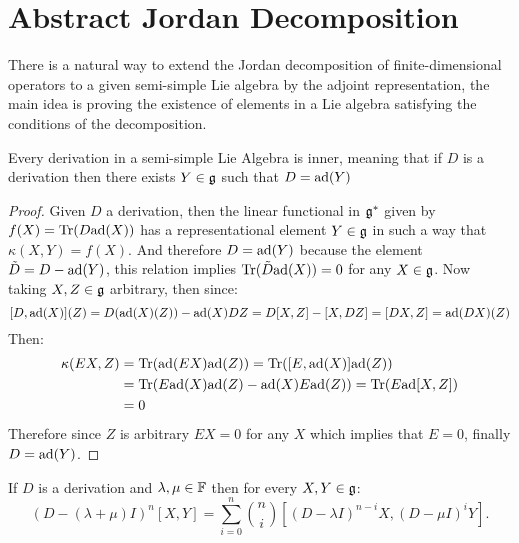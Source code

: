 \section{Abstract Jordan Decomposition}
There is a natural way to extend the Jordan decomposition of finite-dimensional operators to a given semi-simple Lie algebra by the adjoint representation, the main idea is proving the existence of elements in a Lie algebra satisfying the conditions of the decomposition.\\
\begin{lema}
Every derivation in a semi-simple Lie Algebra is inner, meaning that if $D$ is a derivation then there exists $Y \in \mathfrak{g}$ such that $D=\text{ad}(Y)$
\label{InnerDerivations}
\end{lema}
\begin{proof}
Given $D$ a derivation, then the linear functional in $\mathfrak{g}^*$ given by $f(X) = \text{Tr}(D\text{ad}(X))$ has a representational element $Y \in \mathfrak{g}$ in such a way that $\kappa(X,Y) = f(X)$. And therefore $D=\text{ad}(Y)$ because the element $\tilde{D} = D - \text{ad}(Y)$, this relation implies $\text{Tr}(\tilde{D}\text{ad}(X))=0$ for any $X \in \mathfrak{g}$. Now taking $X,Z \in \mathfrak{g}$ arbitrary, then since:
$$[D,\text{ad}(X)](Z) = D(\text{ad}(X)(Z)) - \text{ad}(X)DZ = D[X,Z] - [X,DZ] = [DX,Z] = \text{ad}(DX)(Z)$$
Then:
\begin{align*}
\kappa(EX,Z) &= \text{Tr}(\text{ad}(EX)\text{ad}(Z)) = \text{Tr}([E,\text{ad}(X)]\text{ad}(Z))\\
&= \text{Tr}(E\text{ad}(X)\text{ad}(Z) - \text{ad}(X)E\text{ad}(Z)) = \text{Tr}(E\text{ad}[X,Z])\\
&= 0
\end{align*}
Therefore since $Z$ is arbitrary $EX=0$ for any $X$ which implies that $E=0$, finally $D=\text{ad}(Y)$.
\end{proof}
\begin{lema} 
	If $D$ is a derivation and $\lambda,\mu\in \mathbb{F}$ then for every $X,Y \in \mathfrak{g}$:
	$$(D-(\lambda+\mu)I)^n[X,Y] = \sum_{i=0}^n {n \choose i}[(D-\lambda I)^{n-i}X,(D-\mu I)^iY].$$
	\label{LeibnizProductFormula}
\end{lema}
